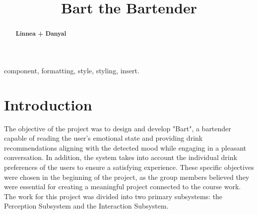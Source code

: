 \documentclass[conference]{IEEEtran}
\begin{document}
\title{Bart the Bartender\\
}

\author{
\and
{}

\and
{}
\and
{}

}

\maketitle


\begin{abstract}
\textbf{Linnea + Danyal}
\end{abstract}

\begin{IEEEkeywords}
component, formatting, style, styling, insert.
\end{IEEEkeywords}

\section{Introduction}

The objective of the project was to design and develop "Bart", a bartender capable of reading the user's emotional state and providing drink recommendations aligning with the detected mood while engaging in a pleasant conversation. In addition, the system takes into account the individual drink preferences of the users to ensure a satisfying experience. These specific objectives were chosen in the beginning of the project, as the group members believed they were essential for creating a meaningful project connected to the course work. 
The work for this project was divided into two primary subsystems: the Perception Subsystem and the Interaction Subsystem. 
\end{document}
